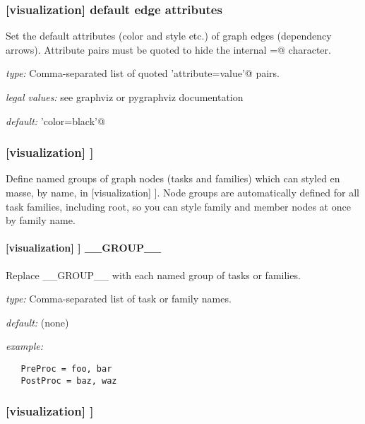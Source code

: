 \subsubsection[default edge attributes]{[visualization] \textrightarrow default edge attributes}

Set the default attributes (color and style etc.) of graph edges
(dependency arrows).  Attribute pairs must be quoted to hide the
internal \lstinline@=@ character.
\begin{myitemize}
    \item {\em type:} Comma-separated list of quoted \lstinline@'attribute=value'@ pairs.
    \item {\em legal values:} see graphviz or pygraphviz documentation
    \item {\em default:} \lstinline@'color=black'@
\end{myitemize}

\subsubsection[{[[}node groups{]]}]{[visualization] \textrightarrow [[node groups]]}

Define named groups of graph nodes (tasks and families) which can styled
en masse, by name, in [visualization] \textrightarrow [[node attributes]].
Node groups are automatically defined for all task families, including
root, so you can style family and member nodes at once by family name.

\paragraph[\_\_GROUP\_\_]{[visualization] \textrightarrow [[node groups]] \textrightarrow \_\_GROUP\_\_}

Replace \_\_GROUP\_\_ with each named group of tasks or families.

\begin{myitemize}
    \item {\em type:} Comma-separated list of task or family names.
    \item {\em default:} (none)
    \item {\em example:}
\begin{lstlisting}
   PreProc = foo, bar
   PostProc = baz, waz
\end{lstlisting}
\end{myitemize}

\subsubsection[{[[}node attributes{]]}]{[visualization] \textrightarrow [[node attributes]]}

